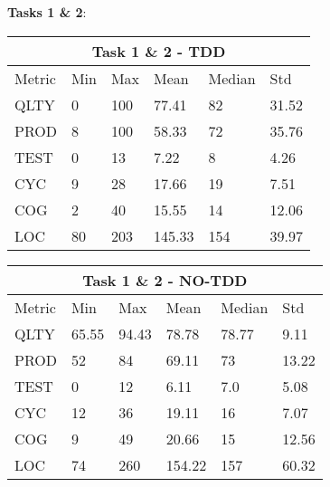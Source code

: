 \textbf{Tasks 1 \& 2}:

\noindent
\begin{tabular}{ |p{2cm}||p{1.6cm}|p{1.6cm}|p{1.6cm}|p{1.6cm}|p{1.6cm}|}
    \hline
        \multicolumn{6}{|c|}{Task 1 \& 2 - TDD} \\
    \hline
        Metric & Min & Max & Mean & Median & Std\\
    \hline
        QLTY & 0 & 100 & 77.41 & 82 & 31.52 \\
        PROD & 8 & 100 & 58.33 & 72 & 35.76 \\
        TEST & 0 & 13 & 7.22 & 8 & 4.26 \\
        CYC & 9 & 28 & 17.66 & 19 & 7.51 \\
        COG & 2 & 40 & 15.55 & 14 & 12.06 \\
        LOC & 80 & 203 & 145.33 & 154 & 39.97 \\
    \hline
\end{tabular}

\noindent
\begin{tabular}{ |p{2cm}||p{1.6cm}|p{1.6cm}|p{1.6cm}|p{1.6cm}|p{1.6cm}|}
    \hline
        \multicolumn{6}{|c|}{Task 1 \& 2 - NO-TDD} \\
    \hline
        Metric & Min & Max & Mean & Median & Std\\
    \hline
        QLTY & 65.55 & 94.43 & 78.78 & 78.77 & 9.11 \\
        PROD & 52 & 84 & 69.11 & 73 & 13.22 \\
        TEST & 0 & 12 & 6.11 & 7.0 & 5.08 \\
        CYC & 12 & 36 & 19.11 & 16 & 7.07 \\
        COG & 9 & 49 & 20.66 & 15 & 12.56 \\
        LOC & 74 & 260 & 154.22 & 157 & 60.32 \\
    \hline
\end{tabular}